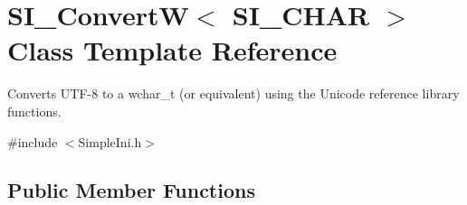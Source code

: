 \hypertarget{class_s_i___convert_w}{}\section{S\+I\+\_\+\+ConvertW$<$ S\+I\+\_\+\+C\+H\+AR $>$ Class Template Reference}
\label{class_s_i___convert_w}


Converts U\+T\+F-\/8 to a wchar\+\_\+t (or equivalent) using the Unicode reference library functions.  




{\ttfamily \#include $<$Simple\+Ini.\+h$>$}

\subsection*{Public Member Functions}
